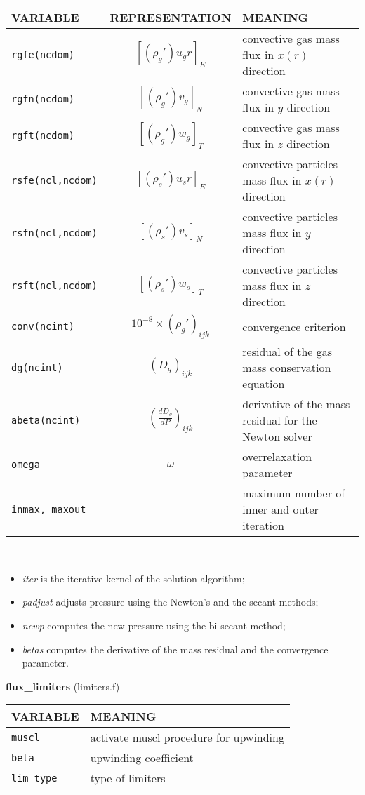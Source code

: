\begin{tabular}{|p{6cm}|c|p{6cm}|}\hline
VARIABLE & REPRESENTATION & MEANING\\\hline
\tt rgfe(ncdom) & $\left[ (\rho_g')u_g r \right]_{E} $ & convective gas mass flux in $x(r)$ direction\\\hline
\tt rgfn(ncdom) & $\left[ (\rho_g')v_g \right]_{N} $ & convective gas mass flux in $y$ direction\\\hline
\tt rgft(ncdom) & $\left[ (\rho_g')w_g \right]_{T} $ & convective gas mass flux in $z$ direction\\\hline
\tt rsfe(ncl,ncdom) & $\left[ (\rho_s')u_s r \right]_{E} $ & convective particles mass flux in $x(r)$ direction\\\hline
\tt rsfn(ncl,ncdom) & $\left[ (\rho_s')v_s \right]_{N} $ & convective particles mass flux in $y$ direction\\\hline
\tt rsft(ncl,ncdom) & $\left[ (\rho_s')w_s \right]_{T} $ & convective particles mass flux in $z$ direction\\\hline
\tt conv(ncint) & $10^{-8}\times(\rho_g')_{ijk}$ & convergence criterion\\\hline
\tt dg(ncint) & $(D_g)_{ijk}$ & residual of the gas mass conservation equation \\\hline
\tt abeta(ncint) & $\left(\frac{dD_g}{dP}\right)_{ijk}$ & derivative of the mass residual for the Newton solver\\\hline
\tt omega & $\omega$ & overrelaxation parameter \\\hline
\tt inmax, maxout && maximum number of inner and outer iteration\\\hline
\end{tabular}\\
\begin{itemize}
\item{\em iter} is the iterative kernel of the solution algorithm;
\item{\em padjust} adjusts pressure using the Newton's and the secant methods;
\item{\em newp} computes the new pressure using the bi-secant method;
\item{\em betas} computes the derivative of the mass residual and the convergence parameter.
\end{itemize}
%
%
{\large{\bf flux\_limiters}} (limiters.f)\\[5mm]
\begin{tabular}{|p{6cm}|p{6cm}|}\hline
VARIABLE &  MEANING\\\hline
\tt  muscl    & activate muscl procedure for upwinding \\\hline
\tt  beta     & upwinding coefficient \\\hline
\tt  lim\_type & type of limiters \\\hline
\end{tabular}\\
